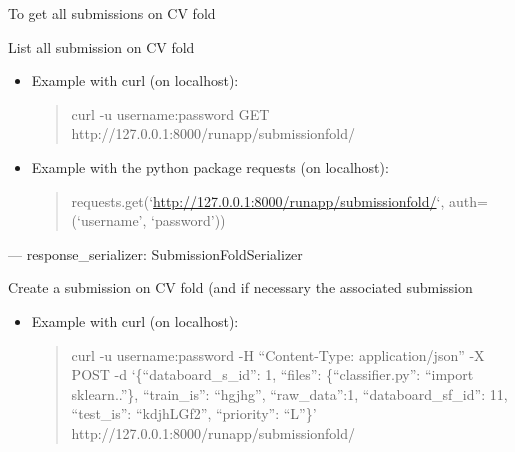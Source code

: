 \documentclass[letterpaper,10pt,english]{sphinxmanual}
\begin{document}
\begin{fulllineitems}
\label{modules/views:runapp.views.SubmissionFoldList}
To get all submissions on CV fold

\begin{fulllineitems}
\label{modules/views:runapp.views.SubmissionFoldList.get}
List all submission on CV fold
\begin{itemize}
\item {} 
Example with curl (on localhost):
\begin{quote}

curl -u username:password GET            http://127.0.0.1:8000/runapp/submissionfold/
\end{quote}

\item {} 
Example with the python package requests (on localhost):
\begin{quote}

requests.get(`\url{http://127.0.0.1:8000/runapp/submissionfold/}`,            auth=(`username', `password'))
\end{quote}

\end{itemize}

---
response\_serializer: SubmissionFoldSerializer

\end{fulllineitems}


\begin{fulllineitems}
\label{modules/views:runapp.views.SubmissionFoldList.post}
Create a submission on CV fold (and if necessary the associated        submission
\begin{itemize}
\item {} 
Example with curl (on localhost):
\begin{quote}

curl -u username:password   -H ``Content-Type: application/json''            -X POST            -d `\{``databoard\_s\_id'': 1, ``files'': \{``classifier.py'':                ``import sklearn..''\}, ``train\_is'': ``hgjhg'', ``raw\_data'':1,                ``databoard\_sf\_id'': 11, ``test\_is'': ``kdjhLGf2'',                ``priority'': ``L''\}'                http://127.0.0.1:8000/runapp/submissionfold/


\end{quote}
\end{itemize}
\end{fulllineitems}
\end{fulllineitems}
\end{document}
